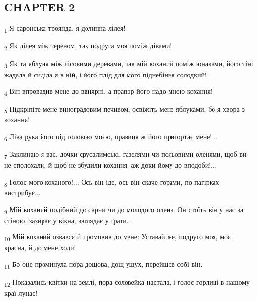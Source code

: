 \subsection{CHAPTER 2}
\begin{tcolorbox}
\textsubscript{1} Я саронська троянда, я долинна лілея!
\end{tcolorbox}
\begin{tcolorbox}
\textsubscript{2} Як лілея між тереном, так подруга моя поміж дівами!
\end{tcolorbox}
\begin{tcolorbox}
\textsubscript{3} Як та яблуня між лісовими деревами, так мій коханий поміж юнаками, його тіні жадала й сиділа я в ній, і його плід для мого піднебіння солодкий!
\end{tcolorbox}
\begin{tcolorbox}
\textsubscript{4} Він впровадив мене до винярні, а прапор його надо мною кохання!
\end{tcolorbox}
\begin{tcolorbox}
\textsubscript{5} Підкріпіте мене виноградовим печивом, освіжіть мене яблуками, бо я хвора з кохання!
\end{tcolorbox}
\begin{tcolorbox}
\textsubscript{6} Ліва рука його під головою моєю, правиця ж його пригортає мене!...
\end{tcolorbox}
\begin{tcolorbox}
\textsubscript{7} Заклинаю я вас, дочки єрусалимські, газелями чи польовими оленями, щоб ви не сполохали, й щоб не збудили кохання, аж доки йому до вподоби!...
\end{tcolorbox}
\begin{tcolorbox}
\textsubscript{8} Голос мого коханого!... Ось він іде, ось він скаче горами, по пагірках вистрибує...
\end{tcolorbox}
\begin{tcolorbox}
\textsubscript{9} Мій коханий подібний до сарни чи до молодого оленя. Он стоїть він у нас за стіною, зазирає у вікна, заглядає у ґрати...
\end{tcolorbox}
\begin{tcolorbox}
\textsubscript{10} Мій коханий озвався й промовив до мене: Уставай же, подруго моя, моя красна, й до мене ходи!
\end{tcolorbox}
\begin{tcolorbox}
\textsubscript{11} Бо оце проминула пора дощова, дощ ущух, перейшов собі він.
\end{tcolorbox}
\begin{tcolorbox}
\textsubscript{12} Показались квітки на землі, пора соловейка настала, і голос горлиці в нашому краї лунає!
\end{tcolorbox}
